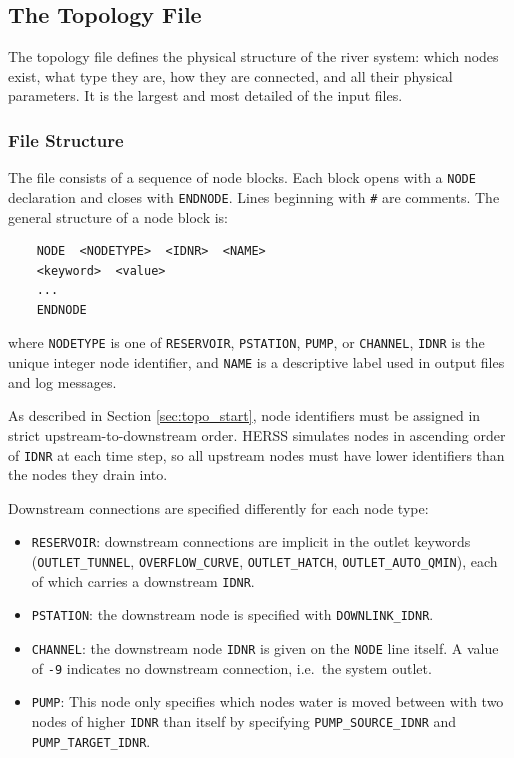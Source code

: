 \documentclass[a4paper, 12pt]{report}
\begin{document}
	\subsection{The Topology File}
	\label{sec:topologyfile}
	The topology file defines the physical structure of the river system: which nodes exist,
	what type they are, how they are connected, and all their physical parameters. It is the largest and most detailed of the input files.

	\subsubsection{File Structure}

	The file consists of a sequence of node blocks. Each block opens with a \texttt{NODE}
	declaration and closes with \texttt{ENDNODE}. Lines beginning with \texttt{\#} are
	comments. The general structure of a node block is:

	\begin{verbatim}
	NODE  <NODETYPE>  <IDNR>  <NAME>
	<keyword>  <value>
	...
	ENDNODE
	\end{verbatim}

	where \texttt{NODETYPE} is one of \texttt{RESERVOIR}, \texttt{PSTATION}, \texttt{PUMP}, or
	\texttt{CHANNEL}, \texttt{IDNR} is the unique integer node identifier, and \texttt{NAME}
	is a descriptive label used in output files and log messages.

	As described in Section \ref{sec:topo_start}, node identifiers must be assigned in
	strict upstream-to-downstream order. HERSS simulates nodes in ascending order of
	\texttt{IDNR} at each time step, so all upstream nodes must have lower identifiers than the nodes they drain into.

	Downstream connections are specified differently for each node type:

	\begin{itemize}
	\item \texttt{RESERVOIR}: downstream connections are implicit in the outlet
	keywords (\texttt{OUTLET\_TUNNEL}, \texttt{OVERFLOW\_CURVE},
	\texttt{OUTLET\_HATCH}, \texttt{OUTLET\_AUTO\_QMIN}), each of which
	carries a downstream \texttt{IDNR}.
	\item \texttt{PSTATION}: the downstream node is specified with
	\texttt{DOWNLINK\_IDNR}.
	\item \texttt{CHANNEL}: the downstream node \texttt{IDNR} is given on the
	\texttt{NODE} line itself. A value of \texttt{-9} indicates no downstream
	connection, i.e.\ the system outlet.
    \item \texttt{PUMP}: This node only specifies which nodes water is moved between with two nodes of higher \texttt{IDNR} than itself by specifying \texttt{PUMP\_SOURCE\_IDNR} and \texttt{PUMP\_TARGET\_IDNR}.
	\end{itemize}
\end{document}

